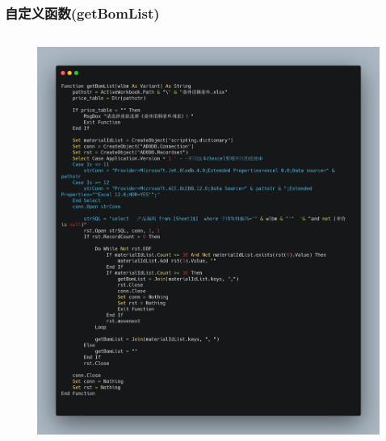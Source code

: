 \begin{frame}[fragile]
	\frametitle{自定义函数(getBomList)}
	\begin{columns}
		\begin{column}{\textwidth}
			\begin{figure}		
				\includegraphics[height=\textheight]{figures/getBomList.png}
			\end{figure}
		\end{column}
	\end{columns}
\end{frame}

